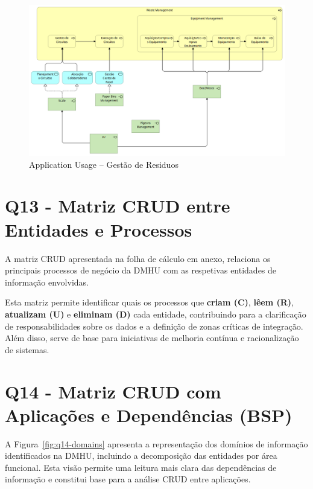 \documentclass[12pt,a4paper,final]{article}
\begin{document}
    \begin{figure}[H]
        \centering
        \includegraphics[width=\textwidth]{Q10_8}
        \caption{Application Usage – Gestão de Residuos}
        \label{fig:q10_8}
    \end{figure}

    \section*{Q13 - Matriz CRUD entre Entidades e Processos}

    A matriz CRUD apresentada na folha de cálculo em anexo, relaciona os principais processos de negócio da DMHU com as respetivas entidades de informação envolvidas.

    Esta matriz permite identificar quais os processos que \textbf{criam (C)}, \textbf{lêem (R)}, \textbf{atualizam (U)} e \textbf{eliminam (D)} cada entidade, contribuindo para a clarificação de responsabilidades sobre os dados e a definição de zonas críticas de integração.
    Além disso, serve de base para iniciativas de melhoria contínua e racionalização de sistemas.

    \section*{Q14 - Matriz CRUD com Aplicações e Dependências (BSP)}

    A Figura~\ref{fig:q14-domains} apresenta a representação dos domínios de informação identificados na DMHU, incluindo a decomposição das entidades por área funcional.
    Esta visão permite uma leitura mais clara das dependências de informação e constitui base para a análise CRUD entre aplicações.
\end{document}
